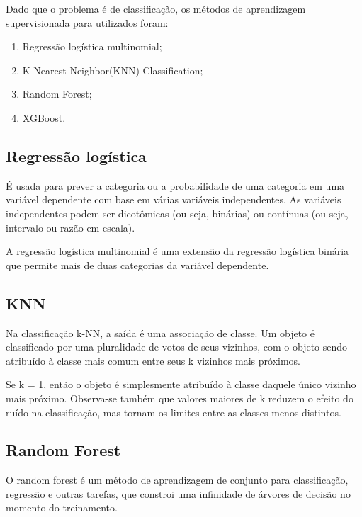\documentclass[
  12pt,
  portuguese,
]{report}
\providecommand{\tightlist}{%
  \setlength{\itemsep}{0pt}\setlength{\parskip}{0pt}}
\begin{document}
Dado que o problema é de classificação, os métodos de aprendizagem supervisionada para utilizados foram:

\begin{enumerate}
\def\labelenumi{\arabic{enumi}.}
\tightlist
\item
  Regressão logística multinomial;
\item
  K-Nearest Neighbor(KNN) Classification;
\item
  Random Forest;
\item
  XGBoost.
\end{enumerate}

\hypertarget{regressuxe3o-loguxedstica}{%
\subsection{Regressão logística}\label{regressuxe3o-loguxedstica}}

É usada para prever a categoria ou a probabilidade de uma categoria em uma variável dependente com base em várias variáveis independentes. As variáveis independentes podem ser dicotômicas (ou seja, binárias) ou contínuas (ou seja, intervalo ou razão em escala).

A regressão logística multinomial é uma extensão da regressão logística binária que permite mais de duas categorias da variável dependente.

\hypertarget{knn}{%
\subsection{KNN}\label{knn}}

Na classificação k-NN, a saída é uma associação de classe. Um objeto é classificado por uma pluralidade de votos de seus vizinhos, com o objeto sendo atribuído à classe mais comum entre seus k vizinhos mais próximos.

Se k = 1, então o objeto é simplesmente atribuído à classe daquele único vizinho mais próximo. Observa-se também que valores maiores de k reduzem o efeito do ruído na classificação, mas tornam os limites entre as classes menos distintos.

\hypertarget{random-forest}{%
\subsection{Random Forest}\label{random-forest}}

O random forest é um método de aprendizagem de conjunto para classificação, regressão e outras tarefas, que constroi uma infinidade de árvores de decisão no momento do treinamento.
\end{document}

